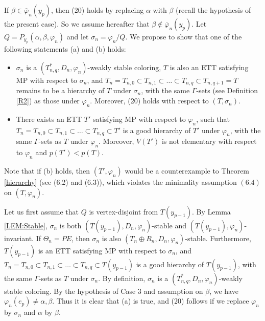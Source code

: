 \documentclass[11pt]{article}
\begin{document}
If $\beta \in \overline{\varphi}_n(y_p)$, then (20) holds by replacing $\alpha$ with $\beta$ (recall the hypothesis of
the present case). So we assume hereafter that $\beta \notin \overline{\varphi}_n(y_p)$. Let $Q=P_{y_p}(\alpha, \beta, \varphi_n)$ 
and let $\sigma_n=\varphi_n/Q$. We propose to show that one of the following statements (a) and (b) holds:
\begin{itemize}
\vspace{-2mm}
\item[(a)] $\sigma_n$ is a $(T_{n,q}^*, D_n,\varphi_n)$-weakly stable coloring, 
 $T$ is also an ETT satisfying MP with respect to $\sigma_n$, and $T_n=T_{n,0} \subset T_{n,1}
\subset \ldots \subset T_{n,q}\subset T_{n,q+1}=T$ remains to be a hierarchy of $T$ under $\sigma_n$, with the 
same $\Gamma$-sets (see Definition \ref{R2}) as those under $\varphi_n$. Moreover, (20) holds with respect to 
$(T, \sigma_n)$. 
\vspace{-2mm}
\item[(b)] There exists an ETT $T'$ satisfying MP with respect to $\varphi_n$, such that $T_n=T_{n,0} \subset T_{n,1}
\subset \ldots \subset T_{n,q}\subset T'$ is a good hierarchy of $T'$ under $\varphi_n$, with the 
same $\Gamma$-sets as $T$ under $\varphi_n$. Moreover, $V(T')$ is not elementary with respect to $\varphi_n$
and $p(T') < p(T)$.
\vspace{-2mm}
\end{itemize}

\noindent Note that if (b) holds, then $(T', \varphi_n)$ would be a counterexample to Theorem \ref{hierarchy} (see (6.2) 
and (6.3)), which violates the minimality assumption $(6.4)$ on $(T, \varphi_n)$.

Let us first assume that $Q$ is vertex-disjoint from $T(y_{p-1})$. By Lemma \ref{LEM:Stable}, $\sigma_n$ is both $(T(y_{p-1}),D_n,\varphi_n)$-stable and $(T(y_{p-1}),\varphi_n)$-invariant. If $\Theta_n=PE$, then $\sigma_n$ is also
$(T_n\oplus R_n,D_n,\varphi_n)$-stable. Furthermore, $T(y_{p-1})$ is an ETT satisfying MP with respect to $\sigma_n$,
and $T_n=T_{n,0} \subset T_{n,1} \subset \ldots \subset T_{n,q} \subset T(y_{p-1})$ is a good hierarchy of 
$T(y_{p-1})$, with the same $\Gamma$-sets as $T$ under $\sigma_n$. By definition, $\sigma_n$ is a $(T_{n,q}^*, D_n,\varphi_n)$-weakly stable coloring. By the hypothesis of Case 3 and assumption on $\beta$, we have $\varphi_n(e_p) \ne \alpha, 
\beta$. Thus it is clear that (a) is true, and (20) follows if we replace $\varphi_n$ by $\sigma_n$ and $\alpha$ by $\beta$.
\end{document}
